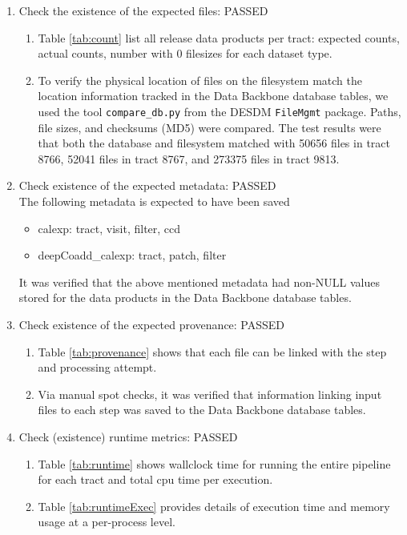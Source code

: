 \documentclass[DM,lsstdraft,STR,toc]{lsstdoc}
\begin{document}
\begin{enumerate}

  \item{Check the existence of the expected files: PASSED}

  \begin{enumerate}

    \item{
      Table \ref{tab:count} list all release data products per tract:  expected counts, actual counts, number with 0 filesizes for each dataset type.}

    \item{
      To verify the physical location of files on the filesystem match the location information tracked in the Data Backbone database tables, we used the tool
	  \texttt{compare{\_}db.py} from the DESDM \texttt{FileMgmt} package.
      Paths, file sizes, and checksums (MD5) were compared.
      The test results were that both the database and filesystem matched with 50656 files in tract 8766, 52041 files in tract 8767, and 273375 files in tract 9813.
    }
  \end{enumerate}

  \item{
    Check existence of the expected metadata: PASSED\\
    The following metadata is expected to have been saved

    \begin{itemize}
      \item{calexp: tract, visit, filter, ccd}
      \item{deepCoadd\_calexp: tract, patch, filter}
    \end{itemize}

    It was verified that the above mentioned metadata had non-NULL values stored for the data products in the Data Backbone database tables.
  }

  \item{
    Check existence of the expected provenance: PASSED

    \begin{enumerate}
      \item{Table \ref{tab:provenance} shows that each file can be linked with the step and processing attempt.}
      \item{Via manual spot checks, it was verified that information linking input files to each step was saved to the Data Backbone database tables.}
    \end{enumerate}
  }

  \item{Check (existence) runtime metrics: PASSED

    \begin{enumerate}
      \item{Table \ref{tab:runtime} shows wallclock time for running the entire pipeline for each tract and total cpu time per execution.}
      \item{Table \ref{tab:runtimeExec} provides details of execution time and memory usage at a per-process level.}
    \end{enumerate}
  }
\end{enumerate}
\end{document}
